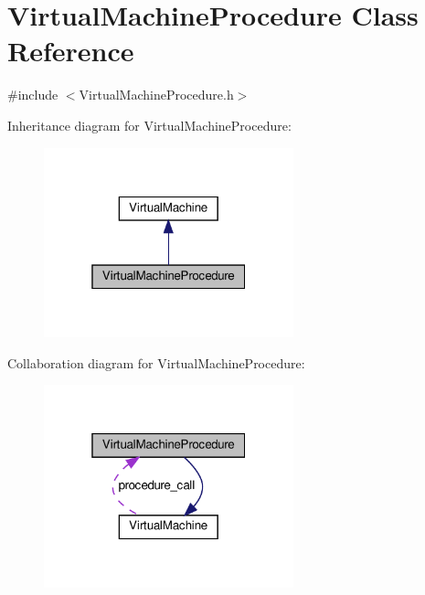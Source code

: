 \hypertarget{classVirtualMachineProcedure}{}\section{Virtual\+Machine\+Procedure Class Reference}
\label{classVirtualMachineProcedure}


{\ttfamily \#include $<$Virtual\+Machine\+Procedure.\+h$>$}



Inheritance diagram for Virtual\+Machine\+Procedure\+:\nopagebreak
\begin{figure}[H]
\begin{center}
\leavevmode
\includegraphics[width=205pt]{classVirtualMachineProcedure__inherit__graph}
\end{center}
\end{figure}


Collaboration diagram for Virtual\+Machine\+Procedure\+:\nopagebreak
\begin{figure}[H]
\begin{center}
\leavevmode
\includegraphics[width=205pt]{classVirtualMachineProcedure__coll__graph}
\end{center}
\end{figure}

